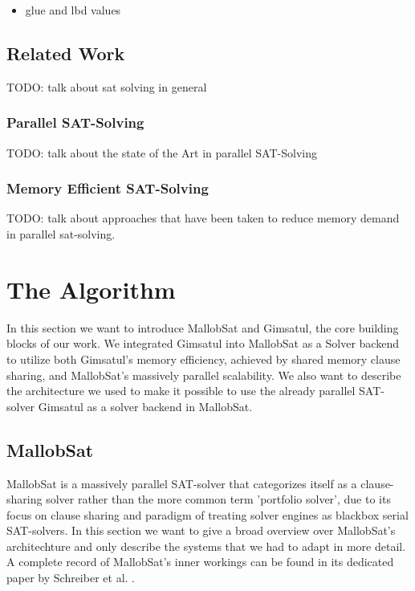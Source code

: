 \documentclass[12pt,a4paper,twoside]{scrartcl}
\numberwithin{equation}{section}
\begin{document}
\begin{itemize}
  \item glue and lbd values
\end{itemize}

\subsection{Related Work}

TODO: talk about sat solving in general

\subsubsection{Parallel SAT-Solving}

TODO: talk about the state of the Art in parallel SAT-Solving

\subsubsection{Memory Efficient SAT-Solving}

TODO: talk about approaches that have been taken to reduce memory demand in parallel sat-solving.


\section{The Algorithm}

In this section we want to introduce MallobSat and Gimsatul, the core building blocks of our work. We integrated Gimsatul into MallobSat as a Solver backend to utilize both Gimsatul's memory efficiency, achieved by shared memory clause sharing, and MallobSat's massively parallel scalability. We also want to describe the architecture we used to make it possible to use the already parallel SAT-solver Gimsatul as a solver backend in MallobSat.

\subsection{MallobSat}

MallobSat \cite{mallobSat} is a massively parallel SAT-solver that categorizes itself as a clause-sharing solver rather than the more common term 'portfolio solver', due to its focus on clause sharing and paradigm of treating solver engines as blackbox serial SAT-solvers. In this section we want to give a broad overview over MallobSat's architechture and only describe the systems that we had to adapt in more detail. A complete record of MallobSat's inner workings can be found in its dedicated paper by Schreiber et al. \cite{mallobSat}.
\end{document}
